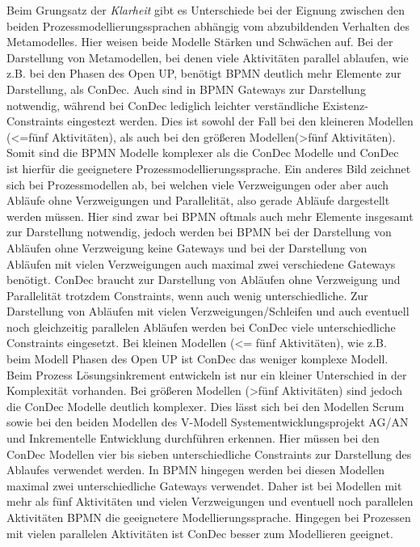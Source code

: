 Beim Grungsatz der \textit{Klarheit} gibt es Unterschiede bei der Eignung zwischen den beiden Prozessmodellierungssprachen abhängig vom abzubildenden Verhalten des Metamodelles. Hier weisen beide Modelle Stärken und Schwächen auf. \newline
Bei der Darstellung von Metamodellen, bei denen viele Aktivitäten parallel ablaufen, wie z.B. bei den Phasen des Open UP, benötigt BPMN deutlich mehr Elemente zur Darstellung, als ConDec. Auch sind in BPMN Gateways zur Darstellung notwendig, während bei ConDec lediglich leichter verständliche Existenz-Constraints eingestezt werden. Dies ist sowohl der Fall bei den kleineren Modellen (<=fünf Aktivitäten), als auch bei den größeren Modellen(>fünf Aktivitäten). Somit sind die BPMN Modelle komplexer als die ConDec Modelle und ConDec ist hierfür die geeignetere Prozessmodellierungssprache. \newline
Ein anderes Bild zeichnet sich bei Prozessmodellen ab, bei welchen viele Verzweigungen oder aber auch Abläufe ohne Verzweigungen und Parallelität, also gerade Abläufe dargestellt werden müssen. Hier sind zwar bei BPMN oftmals auch mehr Elemente insgesamt zur Darstellung notwendig, jedoch werden bei BPMN bei der Darstellung von Abläufen ohne Verzweigung keine Gateways und bei der Darstellung von Abläufen mit vielen Verzweigungen auch maximal zwei verschiedene Gateways benötigt. ConDec braucht zur Darstellung von Abläufen ohne Verzweigung und Parallelität trotzdem Constraints, wenn auch wenig unterschiedliche. Zur Darstellung von Abläufen mit vielen Verzweigungen/Schleifen und auch eventuell noch gleichzeitig parallelen Abläufen werden bei ConDec viele unterschiedliche Constraints eingesetzt. Bei kleinen Modellen (<= fünf Aktivitäten), wie z.B. beim Modell Phasen des Open UP ist ConDec das weniger komplexe Modell. Beim Prozess Lösungsinkrement entwickeln ist nur ein kleiner Unterschied in der Komplexität vorhanden. Bei größeren Modellen (>fünf Aktivitäten) sind jedoch die ConDec Modelle deutlich komplexer. Dies lässt sich bei den Modellen Scrum sowie bei den beiden Modellen des V-Modell Systementwicklungsprojekt AG/AN und Inkrementelle Entwicklung durchführen erkennen. Hier müssen bei den ConDec Modellen vier bis sieben unterschiedliche Constraints zur Darstellung des Ablaufes verwendet werden. In BPMN hingegen werden bei diesen Modellen maximal zwei unterschiedliche Gateways verwendet. Daher ist bei Modellen mit mehr als fünf Aktivitäten und vielen Verzweigungen und eventuell noch parallelen Aktivitäten BPMN die geeignetere Modellierungssprache. Hingegen bei Prozessen mit vielen parallelen Aktivitäten ist ConDec besser zum Modellieren geeignet.\newline

